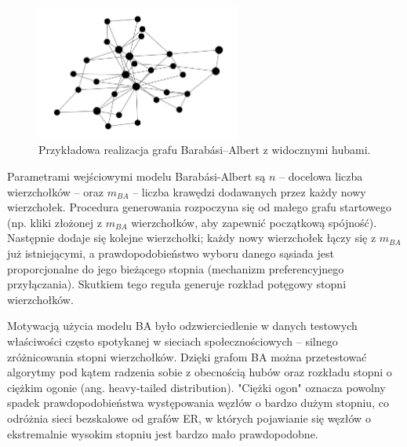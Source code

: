 \begin{figure}[h]
    \centering
    \includegraphics[width=0.6\textwidth]{assets/test_data/scalefree.png}
    \caption{Przykładowa realizacja grafu Barabási--Albert z widocznymi hubami.}
    \label{fig:BA}
\end{figure}

Parametrami wejściowymi modelu Barabási-Albert są $n$ -- docelowa liczba wierzchołków -- oraz $m_{BA}$ -- liczba krawędzi dodawanych przez każdy nowy wierzchołek. Procedura generowania rozpoczyna się od małego grafu startowego (np. kliki złożonej z $m_{BA}$ wierzchołków, aby zapewnić początkową spójność). Następnie dodaje się kolejne wierzchołki; każdy nowy wierzchołek łączy się z $m_{BA}$ już istniejącymi, a prawdopodobieństwo wyboru danego sąsiada jest proporcjonalne do jego bieżącego stopnia (mechanizm preferencyjnego przyłączania). Skutkiem tego reguła generuje rozkład potęgowy stopni wierzchołków.

Motywacją użycia modelu BA było odzwierciedlenie w danych testowych właściwości często spotykanej w sieciach społecznościowych -- silnego zróżnicowania stopni wierzchołków. Dzięki grafom BA można przetestować algorytmy pod kątem radzenia sobie z obecnością hubów oraz rozkładu stopni o ciężkim ogonie (ang. heavy-tailed distribution). "Ciężki ogon" oznacza powolny spadek prawdopodobieństwa występowania węzłów o bardzo dużym stopniu, co odróżnia sieci bezskalowe od grafów ER, w których pojawianie się węzłów o ekstremalnie wysokim stopniu jest bardzo mało prawdopodobne.

